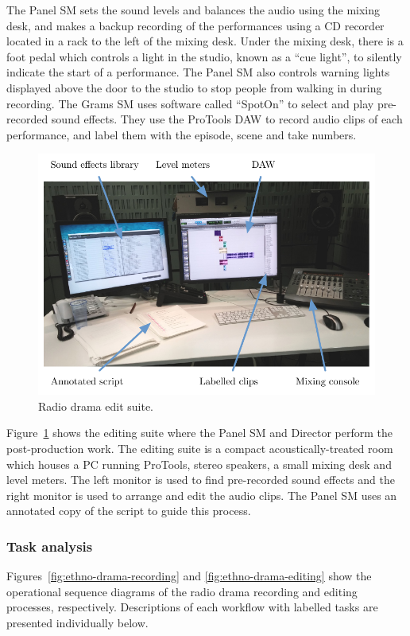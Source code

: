 The Panel SM sets the sound levels and balances the audio using the mixing desk, and makes a backup recording of the
performances using a CD recorder located in a rack to the left of the mixing desk.  Under the mixing desk, there is a
foot pedal which controls a light in the studio, known as a ``cue light'', to silently indicate the start of a
performance. The Panel SM also controls warning lights displayed above the door to the studio to stop people from
walking in during recording.  The Grams SM uses software called ``SpotOn'' \citep{Cridford2005} to select and play
pre-recorded sound effects. They use the ProTools DAW to record audio clips of each performance, and label them with
the episode, scene and take numbers.

\begin{figure}[t]
  \centering
  \includegraphics[width=\columnwidth]{figs/drama-edit-labelled.pdf}
  \caption{Radio drama edit suite.}
  \label{fig:drama-edit}
\end{figure}

Figure~\ref{fig:drama-edit} shows the editing suite where the Panel SM and Director perform the post-production work.
The editing suite is a compact acoustically-treated room which houses a PC running ProTools, stereo speakers, a small
mixing desk and level meters.  The left monitor is used to find pre-recorded sound effects and the right monitor is
used to arrange and edit the audio clips. The Panel SM uses an annotated copy of the script to guide this process.


\subsubsection{Task analysis}
Figures~\ref{fig:ethno-drama-recording} and \ref{fig:ethno-drama-editing} show the operational sequence diagrams of the
radio drama recording and editing processes, respectively. Descriptions of each workflow with labelled tasks are
presented individually below.

